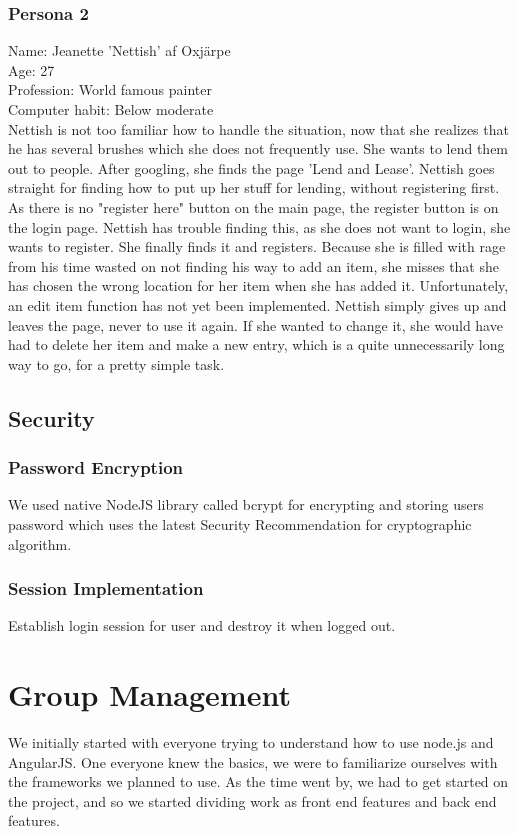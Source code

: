 \documentclass[a4paper]{article}
\begin{document}
\subsubsection{Persona 2}
Name: Jeanette 'Nettish' af Oxjärpe \\
Age: 27 \\
Profession: World famous painter \\
Computer habit: Below moderate \\
\newline Nettish is not too familiar how to handle the situation, now that she realizes that he has several brushes
which she does not frequently use. She wants to lend them out to people. After googling, she finds the page 'Lend and Lease'.
Nettish goes straight for finding how to put up her stuff for lending, without registering first. As there is no "register here"
button on the main page, the register button is on the login page. Nettish has trouble finding this, as she does not want to login,
she wants to register. She finally finds it and registers. Because she is filled with rage from his time wasted on not finding his way
to add an item, she misses that she has chosen the wrong location for her item when she has added it. Unfortunately, an edit item function has not yet been implemented. Nettish simply gives up and leaves the page, never to use it again. If she wanted to change it, she would
have had to delete her item and make a new entry, which is a quite  unnecessarily long way to go, for a pretty simple task.



\subsection{Security}
\subsubsection{Password Encryption} We used native NodeJS library called bcrypt for encrypting and storing users password which uses the latest Security Recommendation for cryptographic algorithm. \cite{bcrypt} 

\subsubsection{Session Implementation} Establish login session for user and destroy it when logged out. 

\section{Group Management}
We initially started with everyone trying to understand how to use node.js and AngularJS. One everyone knew the basics, we were to familiarize ourselves with the frameworks we planned to use. As the time went by, we had to get started on the project, and so we started dividing work as front end features and back end features.
\end{document}

